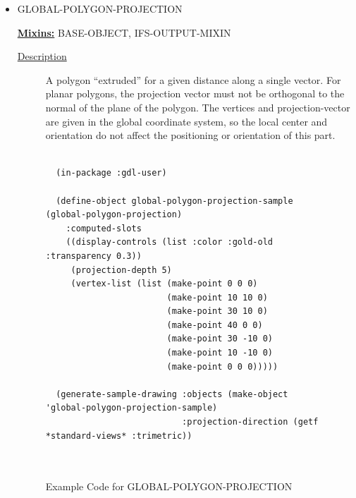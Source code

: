 \documentclass [11pt]{book}
\begin{document}
\begin{itemize}
\item {}GLOBAL-POLYGON-PROJECTION


\textbf{
\underline{Mixins:}} BASE-OBJECT, IFS-OUTPUT-MIXIN





\begin{description}

\item [
\underline{Description}]


A polygon ``extruded'' for a given distance along a single vector.
For planar polygons, the projection vector must not be orthogonal to the normal of the plane of
the polygon. The vertices and projection-vector are given in the global coordinate system, so
the local center and orientation do not affect the positioning or orientation of this part.



\end{description}




\begin{figure}
\begin{lrbox}{\boxedverb}
\begin{minipage}{\linewidth}
{\small

\begin{verbatim}

  (in-package :gdl-user)

  (define-object global-polygon-projection-sample (global-polygon-projection)
    :computed-slots
    ((display-controls (list :color :gold-old :transparency 0.3))
     (projection-depth 5)
     (vertex-list (list (make-point 0 0 0)
                        (make-point 10 10 0)
                        (make-point 30 10 0)
                        (make-point 40 0 0)
                        (make-point 30 -10 0)
                        (make-point 10 -10 0)
                        (make-point 0 0 0)))))

  (generate-sample-drawing :objects (make-object 'global-polygon-projection-sample)
                           :projection-direction (getf *standard-views* :trimetric))  

  
\end{verbatim}}
\end{minipage}
\end{lrbox}
\fbox{\usebox{\boxedverb}}

\caption{Example Code for GLOBAL-POLYGON-PROJECTION}


\end{figure}
\end{itemize}
\end{document}
